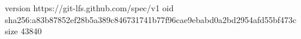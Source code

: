 version https://git-lfs.github.com/spec/v1
oid sha256:a83b87852ef28b5a389c846731741b77f96cae9ebabd0a2bd2954afd55bf473c
size 43840
